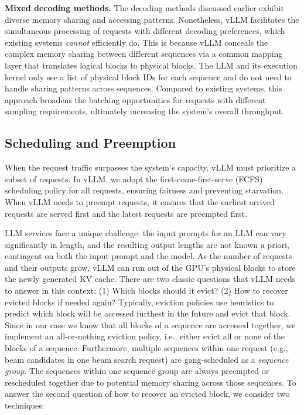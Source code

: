 \textbf{Mixed decoding methods.} The decoding methods discussed earlier exhibit diverse memory sharing and accessing patterns. Nonetheless, vLLM facilitates the simultaneous processing of requests with different decoding preferences, which existing systems \emph{cannot} efficiently do. This is because vLLM conceals the complex memory sharing between different sequences via a common mapping layer that translates logical blocks to physical blocks. The LLM and its execution kernel only see a list of physical block IDs for each sequence and do not need to handle sharing patterns across sequences. Compared to existing systems, this approach broadens the batching opportunities for requests with different sampling requirements, ultimately increasing the system's overall throughput.

\subsection{Scheduling and Preemption}
\label{sec:scheduling}

When the request traffic surpasses the system’s capacity, vLLM must prioritize a subset of requests. In vLLM, we adopt the first-come-first-serve (FCFS) scheduling policy for all requests, ensuring fairness and preventing starvation. When vLLM needs to preempt requests, it ensures that the earliest arrived requests are served first and the latest requests are preempted first.

LLM services face a unique challenge: the input prompts for an LLM can vary significantly in length, and the resulting output lengths are not known a priori, contingent on both the input prompt and the model. As the number of requests and their outputs grow, vLLM can run out of the GPU's physical blocks to store the newly generated KV cache. There are two classic questions that vLLM needs to answer in this context: (1) Which blocks should it evict? (2) How to recover evicted blocks if needed again? Typically, eviction policies use heuristics to predict which block will be accessed furthest in the future and evict that block. Since in our case we know that all blocks of a sequence are accessed together, we implement an all-or-nothing eviction policy, i.e., either evict all or none of the blocks of a sequence. Furthermore, multiple sequences within one request (e.g., beam candidates in one beam search request) are gang-scheduled as a \emph{sequence group}. The sequences within one sequence group are always preempted or rescheduled together due to potential memory sharing across those sequences. To answer the second question of how to recover an evicted block, we consider two techniques:

